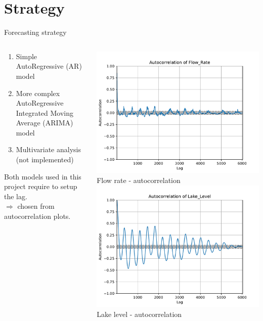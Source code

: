 \documentclass[aspectratio=169, glossy]{beamer}
\begin{document}
\section{Strategy}

\begin{frame}{Forecasting strategy}
  \begin{columns}
    \begin{column}{0.6\columnwidth}
      \begin{enumerate}
          \item Simple AutoRegressive (AR) model
          \item More complex AutoRegressive Integrated Moving Average (ARIMA) model
          \item Multivariate analysis (not implemented)
      \end{enumerate}
      \vspace{2em}
      Both models used in this project require to setup the lag.\\
      $\Rightarrow$ chosen from autocorrelation plots.
    \end{column}
    \begin{column}{0.4\columnwidth}
      \begin{center}
        \includegraphics[width=0.65\columnwidth]{../plots/flow_rate_autocorr.pdf}\\
        \tiny{Flow rate - autocorrelation}\\
        \vspace{1em}
        \includegraphics[width=0.65\columnwidth]{../plots/lake_level_autocorr.pdf}\\
        \tiny{Lake level - autocorrelation}
      \end{center}
    \end{column}
  \end{columns}
\end{frame}
\end{document}
